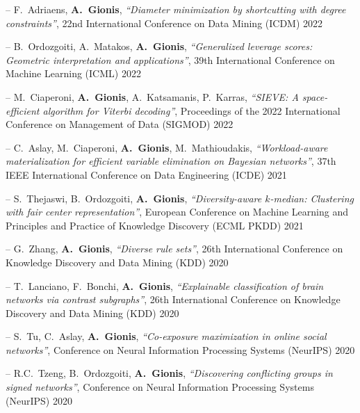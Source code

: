 \documentclass[a4paper,11pt]{article}
\begin{document}
\item[--] 
{F.\ Adriaens, \textbf{A.\ Gionis}},
{\em ``Diameter minimization by shortcutting with degree constraints''},
22nd International Conference on Data Mining (ICDM) 2022

\item[--] 
{B.\ Ordozgoiti, A.\ Matakos, \textbf{A.\ Gionis}},
{\em ``Generalized leverage scores: Geometric interpretation and applications''},
39th International Conference on Machine Learning (ICML) 2022

\item[--] 
{M.\ Ciaperoni, \textbf{A.\ Gionis}, A.\ Katsamanis, P.\ Karras},
{\em ``SIEVE: A space-efficient algorithm for Viterbi decoding''},
Proceedings of the 2022 International Conference on Management of Data (SIGMOD) 2022


\item[--] 
{C.\ Aslay, M.\ Ciaperoni, \textbf{A.\ Gionis}, M.\ Mathioudakis},
{\em ``Workload-aware materialization for efficient variable elimination on Bayesian networks''},
37th IEEE International Conference on Data Engineering (ICDE) 2021

\item[--] 
{S.\ Thejaswi, B.\ Ordozgoiti, \textbf{A.\ Gionis}},
{\em ``Diversity-aware $k$-median: Clustering with fair center representation''},
European Conference on Machine Learning and Principles and Practice of Knowledge Discovery (ECML PKDD) 2021 

\item[--] 
{G.\ Zhang, \textbf{A.\ Gionis}},
{\em ``Diverse rule sets''},
26th International Conference on Knowledge Discovery and Data Mining (KDD) 2020

\item[--] 
{T.\ Lanciano, F.\ Bonchi, \textbf{A.\ Gionis}},
{\em ``Explainable classification of brain networks via contrast subgraphs''},
26th International Conference on Knowledge Discovery and Data Mining (KDD) 2020

\item[--] 
{S.\ Tu, C.\ Aslay, \textbf{A.\ Gionis}},
{\em ``Co-exposure maximization in online social networks''},
Conference on Neural Information Processing Systems (NeurIPS) 2020

\item[--] 
{R.C.\ Tzeng, B.\ Ordozgoiti, \textbf{A.\ Gionis}},
{\em ``Discovering conflicting groups in signed networks''},
Conference on Neural Information Processing Systems (NeurIPS) 2020
\end{document}
